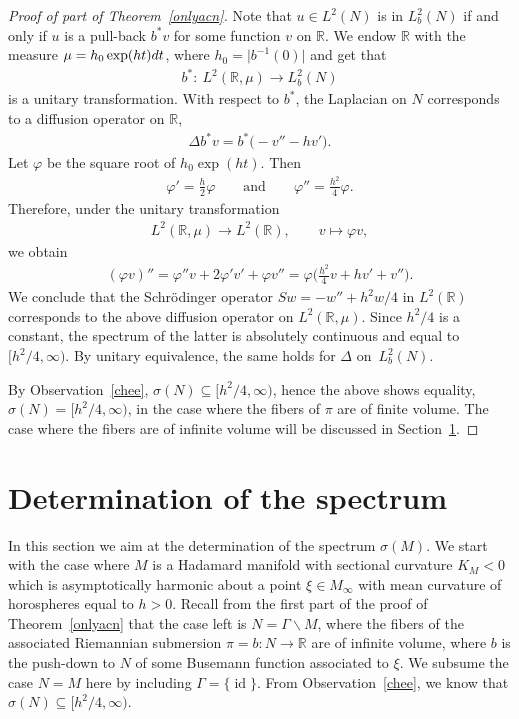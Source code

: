 \documentclass[11pt]{article}
\numberwithin{equation}{section}
\numberwithin{equation}{section}
\DeclareMathOperator{\id}{id}
\def\R{\mathbb R}
\def\vf{\varphi}
\begin{document}
\begin{proof}[Proof of part of Theorem~\ref{onlyacn}]
Note that $u\in L^2(N)$ is in $L^2_b(N)$ if and only if $u$ is a pull-back $b^*v$ for some function $v$ on $\R$.
We endow $\R$ with the measure $\mu=h_0\exp(ht){\rm d}t$,
where $h_0=\big|b^{-1}(0)\big|$ and get that
\begin{align*}%
	b^* \colon \ L^2(\R,\mu) \to L^2_b(N)
\end{align*}
is a unitary transformation.
With respect to $b^*$, the Laplacian on $N$ corresponds to a diffusion operator on $\R$,
\begin{align*}%
	\Delta b^*v = b^*\bigl(- v'' - hv'\bigr).
\end{align*}
Let $\vf$ be the square root of $h_0\exp(ht)$.
Then
\begin{align*}%
	\vf' = \frac{h}2\vf \qquad\text{and}\qquad \vf'' = \frac{h^2}4\vf.
\end{align*}
Therefore, under the unitary transformation
\begin{align*}
	L^2(\R,\mu) \to L^2(\R), \qquad v \mapsto \vf v,
\end{align*}
we obtain
\begin{align*}
	(\vf v)'' = \vf''v +2\vf'v' + \vf v'' = \vf\biggl(\frac{h^2}4 v + hv' + v''\biggr).
\end{align*}
We conclude that the Schr\"odinger operator $Sw=-w''+h^2w/4$ in $L^2(\R)$
corresponds to the above diffusion operator on $L^2(\R,\mu)$.
Since $h^2/4$ is a constant, the spectrum of the latter is absolutely continuous and equal to $\bigl[h^2/4,\infty\bigr)$.
By unitary equivalence, the same holds for $\Delta$ on~$L^2_b(N)$.

By Observation~\ref{chee}, $\sigma(N)\subseteq\bigl[h^2/4,\infty\bigr)$, hence the above shows equality,
$\sigma(N)=\bigl[h^2/4,\infty\bigr)$, in the case where the fibers of $\pi$ are of finite volume.
The case where the fibers are of infinite volume will be discussed in Section~\ref{secsig}.
\end{proof}

\setcounter{section}{5}
\section{Determination of the spectrum}\label{secsig}

In this section we aim at the determination of the spectrum $\sigma(M)$.
We start with the case where $M$ is a Hadamard manifold with sectional curvature $K_M<0$
which is asymptotically harmonic about a point $\xi\in M_\infty$
with mean curvature of horospheres equal to $h>0$.
Recall from the first part of the proof of Theorem~\ref{onlyacn}
that the case left is $N=\Gamma\backslash M$,
where the fibers of the associated Riemannian submersion $\pi=b\colon N\to\R$ are of infinite volume,
where $b$ is the push-down to $N$ of some Busemann function associated to $\xi$.
We subsume the case $N=M$ here by including $\Gamma=\{\id\}$.
From Observation~\ref{chee}, we know that $\sigma(N)\subseteq\bigl[h^2/4,\infty\bigr)$.
\end{document}
